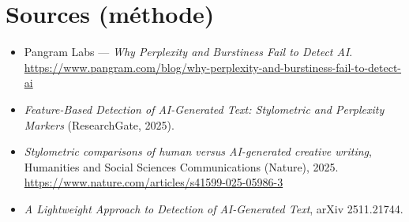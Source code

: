 \documentclass[11pt,a4paper]{article}
\begin{document}
\section*{Sources (méthode)}
\small
\begin{itemize}
  \item Pangram Labs --- \emph{Why Perplexity and Burstiness Fail to Detect AI}.
  \url{https://www.pangram.com/blog/why-perplexity-and-burstiness-fail-to-detect-ai}
  \item \emph{Feature-Based Detection of AI-Generated Text: Stylometric and Perplexity
  Markers} (ResearchGate, 2025).
  \item \emph{Stylometric comparisons of human versus AI-generated creative writing},
  Humanities and Social Sciences Communications (Nature), 2025.
  \url{https://www.nature.com/articles/s41599-025-05986-3}
  \item \emph{A Lightweight Approach to Detection of AI-Generated Text}, arXiv 2511.21744.
\end{itemize}
\normalsize
\end{document}
